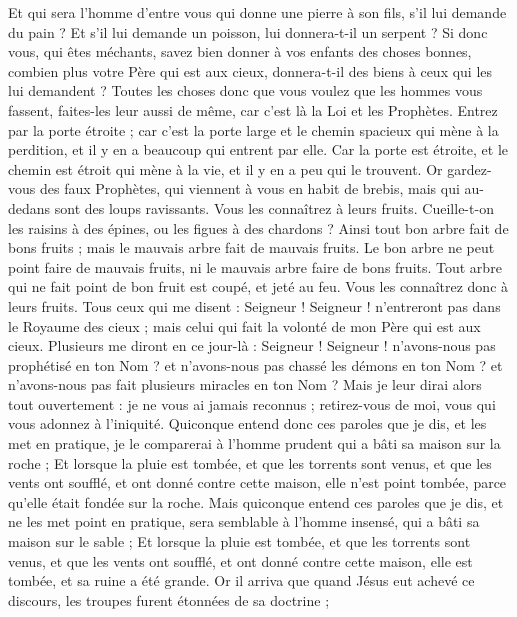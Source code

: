 \begin{multicols}{2}
Et qui sera l'homme d'entre vous qui donne une pierre à son fils, s'il lui demande du pain ?
Et s'il lui demande un poisson, lui donnera-t-il un serpent ?
Si donc vous, qui êtes méchants, savez bien donner à vos enfants des choses bonnes, combien plus votre Père qui est aux cieux, donnera-t-il des biens à ceux qui les lui demandent ?
Toutes les choses donc que vous voulez que les hommes vous fassent, faites-les leur aussi de même, car c'est là la Loi et les Prophètes.
Entrez par la porte étroite ; car c'est la porte large et le chemin spacieux qui mène à la perdition, et il y en a beaucoup qui entrent par elle.
Car la porte est étroite, et le chemin est étroit qui mène à la vie, et il y en a peu qui le trouvent.
Or gardez-vous des faux Prophètes, qui viennent à vous en habit de brebis, mais qui au-dedans sont des loups ravissants.
Vous les connaîtrez à leurs fruits. Cueille-t-on les raisins à des épines, ou les figues à des chardons ?
Ainsi tout bon arbre fait de bons fruits ; mais le mauvais arbre fait de mauvais fruits.
Le bon arbre ne peut point faire de mauvais fruits, ni le mauvais arbre faire de bons fruits.
Tout arbre qui ne fait point de bon fruit est coupé, et jeté au feu.
Vous les connaîtrez donc à leurs fruits.
Tous ceux qui me disent : Seigneur ! Seigneur ! n'entreront pas dans le Royaume des cieux ; mais celui qui fait la volonté de mon Père qui est aux cieux.
Plusieurs me diront en ce jour-là : Seigneur ! Seigneur ! n'avons-nous pas prophétisé en ton Nom ? et n'avons-nous pas chassé les démons en ton Nom ? et n'avons-nous pas fait plusieurs miracles en ton Nom ?
Mais je leur dirai alors tout ouvertement : je ne vous ai jamais reconnus ; retirez-vous de moi, vous qui vous adonnez à l'iniquité.
Quiconque entend donc ces paroles que je dis, et les met en pratique, je le comparerai à l'homme prudent qui a bâti sa maison sur la roche ;
Et lorsque la pluie est tombée, et que les torrents sont venus, et que les vents ont soufflé, et ont donné contre cette maison, elle n'est point tombée, parce qu'elle était fondée sur la roche.
Mais quiconque entend ces paroles que je dis, et ne les met point en pratique, sera semblable à l'homme insensé, qui a bâti sa maison sur le sable ;
Et lorsque la pluie est tombée, et que les torrents sont venus, et que les vents ont soufflé, et ont donné contre cette maison, elle est tombée, et sa ruine a été grande.
Or il arriva que quand Jésus eut achevé ce discours, les troupes furent étonnées de sa doctrine ;

\end{multicols}
